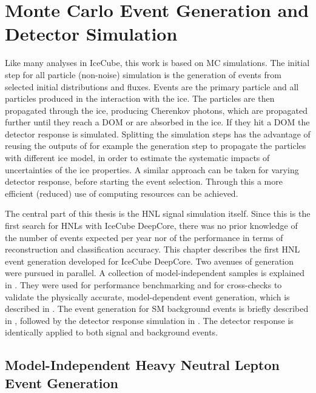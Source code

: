 \setchapterpreamble[u]{\margintoc}

\chapter{Monte Carlo Event Generation and Detector Simulation}

Like many analyses in IceCube, this work is based on MC simulations. The initial step for all particle (non-noise) simulation is the generation of events from selected initial distributions and fluxes. Events are the primary particle and all particles produced in the interaction with the ice. The particles are then propagated through the ice, producing Cherenkov photons, which are propagated further until they reach a DOM or are absorbed in the ice. If they hit a DOM the detector response is simulated. Splitting the simulation steps has the advantage of reusing the outputs of for example the generation step to propagate the particles with different ice model, in order to estimate the systematic impacts of uncertainties of the ice properties. A similar approach can be taken for varying detector response, before starting the event selection. Through this a more efficient (reduced) use of computing resources can be achieved.

The central part of this thesis is the HNL signal simulation itself. Since this is the first search for HNLs with IceCube DeepCore, there was no prior knowledge of the number of events expected per year nor of the performance in terms of reconstruction and classification accuracy. This chapter describes the first HNL event generation developed for IceCube DeepCore. Two avenues of generation were pursued in parallel. A collection of model-independent samples is explained in . They were used for performance benchmarking and for cross-checks to validate the physically accurate, model-dependent event generation, which is described in . The event generation for SM background events is briefly described in , followed by the detector response simulation in . The detector response is identically applied to both signal and background events.


\section{Model-Independent Heavy Neutral Lepton Event Generation} 

